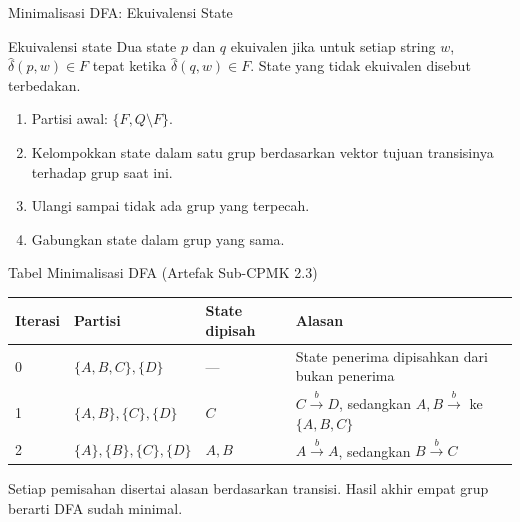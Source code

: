 \documentclass[aspectratio=169,10pt,t]{beamer}
\begin{document}
\begin{frame}{Minimalisasi DFA: Ekuivalensi State}
  \begin{block}{Ekuivalensi state}
    \small
    Dua state \(p\) dan \(q\) ekuivalen jika untuk setiap string \(w\),
    \(\hat{\delta}(p,w) \in F\) tepat ketika
    \(\hat{\delta}(q,w) \in F\). State yang tidak ekuivalen disebut
    terbedakan.
  \end{block}

  \begin{enumerate}
    \setlength{\itemsep}{2pt}
    \item Partisi awal: \(\{F, Q \setminus F\}\).
    \item Kelompokkan state dalam satu grup berdasarkan vektor tujuan
          transisinya terhadap grup saat ini.
    \item Ulangi sampai tidak ada grup yang terpecah.
    \item Gabungkan state dalam grup yang sama.
  \end{enumerate}
\end{frame}

\begin{frame}{Tabel Minimalisasi DFA (Artefak Sub-CPMK 2.3)}
  \scriptsize
  \setlength{\tabcolsep}{4pt}
  \begin{tabular}{@{}p{1.1cm}p{3.3cm}p{2.8cm}p{6.0cm}@{}}
    \toprule
    \textbf{Iterasi} & \textbf{Partisi} &
    \textbf{State dipisah} & \textbf{Alasan} \\
    \midrule
    0 & \(\{A,B,C\},\{D\}\) & --- &
      State penerima dipisahkan dari bukan penerima \\
    1 & \(\{A,B\},\{C\},\{D\}\) & \(C\) &
      \(C \xrightarrow{b} D\), sedangkan \(A,B \xrightarrow{b}\) ke
      \(\{A,B,C\}\) \\
    2 & \(\{A\},\{B\},\{C\},\{D\}\) & \(A,B\) &
      \(A \xrightarrow{b} A\), sedangkan \(B \xrightarrow{b} C\) \\
    \bottomrule
  \end{tabular}

  \vspace{5pt}
  {\scriptsize\color{ubbblue!75}Setiap pemisahan disertai alasan
  berdasarkan transisi. Hasil akhir empat grup berarti DFA sudah
  minimal.}
\end{frame}
\end{document}
